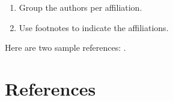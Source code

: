 \documentclass[review]{elsarticle}
\begin{document}
\begin{enumerate}[(1)]
\item Group the authors per affiliation.
\item Use footnotes to indicate the affiliations.
\end{enumerate}

Here are two sample references: \cite{Feynman1963118,Dirac1953888}.

\section*{References}


\end{document}
